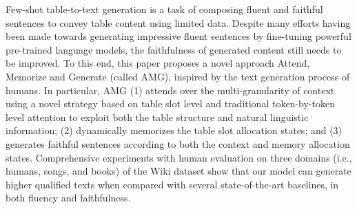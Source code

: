 Few-shot table-to-text generation is a task of composing fluent and faithful sentences to convey table content using limited data. Despite many efforts having been made towards generating impressive fluent sentences by fine-tuning powerful pre-trained language models, the faithfulness of generated content still needs to be improved. To this end, this paper proposes a novel approach Attend, Memorize and Generate (called AMG), inspired by the text generation process of humans. In particular, AMG (1) attends over the multi-granularity of context using a novel strategy based on table slot level and traditional token-by-token level attention to exploit both the table structure and natural linguistic information; (2) dynamically memorizes the table slot allocation states; and (3) generates faithful sentences according to both the context and memory allocation states. Comprehensive experiments with human evaluation on three domains (i.e., humans, songs, and books) of the Wiki dataset show that our model can generate higher qualified texts when compared with several state-of-the-art baselines, in both fluency and faithfulness.
